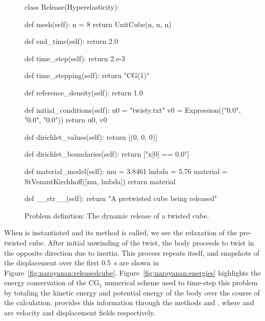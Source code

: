 \begin{figure}[ht]
\begin{python}
class Release(Hyperelasticity):

    def mesh(self):
        n = 8
        return UnitCube(n, n, n)

    def end_time(self):
        return 2.0

    def time_step(self):
        return 2.e-3

    def time_stepping(self):
        return "CG(1)"

    def reference_density(self):
        return 1.0

    def initial_conditions(self):
        u0 = "twisty.txt"
        v0 = Expression(("0.0", "0.0", "0.0"))
        return u0, v0

    def dirichlet_values(self):
        return [(0, 0, 0)]

    def dirichlet_boundaries(self):
        return ["x[0] == 0.0"]

    def material_model(self):
        mu    = 3.8461
        lmbda = 5.76
        material = StVenantKirchhoff([mu, lmbda])
        return material

    def __str__(self):
        return "A pretwisted cube being released"
\end{python}
\caption{Problem definition: The dynamic release of a twisted cube.}
\label{code:narayanan:dynamicrelease}
\end{figure}

When  is instantiated and its  method is
called, we see the relaxation of the pre-twisted cube. After initial
unwinding of the twist, the body proceeds to twist in the opposite
direction due to inertia. This process repeats itself, and snapshots
of the displacement over the first 0.5~s are shown in
Figure~\ref{fig:narayanan:releasedcube}. Figure~\ref{fig:narayanan:energies}
highlights the energy conservation of the CG$_{1}$ numerical scheme used
to time-step this problem by totaling the kinetic energy and
potential energy of the body over the course of the
calculation. \twist{} provides this information through the methods
 and , where 
and  are velocity and displacement fields respectively.

